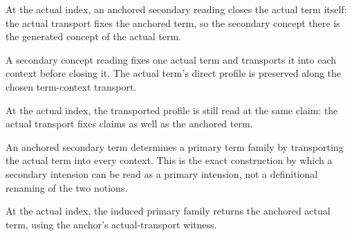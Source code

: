 \begin{theorem}\label{thm:claim-secondary-actual-concept}\leanok{}
At the actual index, an anchored secondary reading closes the actual term itself:
the actual transport fixes the anchored term, so the secondary concept there is
the generated concept of the actual term.
\end{theorem}

\begin{theorem}\label{thm:claim-secondary-profile-preserved}\leanok{}
A secondary concept reading fixes one actual term and transports it into each
context before closing it.  The actual term's direct profile is preserved along
the chosen term-context transport.
\end{theorem}

\begin{theorem}\label{thm:claim-secondary-profile-preserved-actual}\leanok{}
At the actual index, the transported profile is still read at the same claim:
the actual transport fixes claims as well as the anchored term.
\end{theorem}

\begin{proposition}\label{thm:claim-anchor-induced-term-family}\leanok{}
An anchored secondary term determines a primary term family by transporting the
actual term into every context.  This is the exact construction by which a
secondary intension can be read as a primary intension, not a definitional
renaming of the two notions.
\end{proposition}

\begin{theorem}\label{thm:claim-anchor-induced-term-family-actual}\leanok{}
At the actual index, the induced primary family returns the anchored actual
term, using the anchor's actual-transport witness.
\end{theorem}

